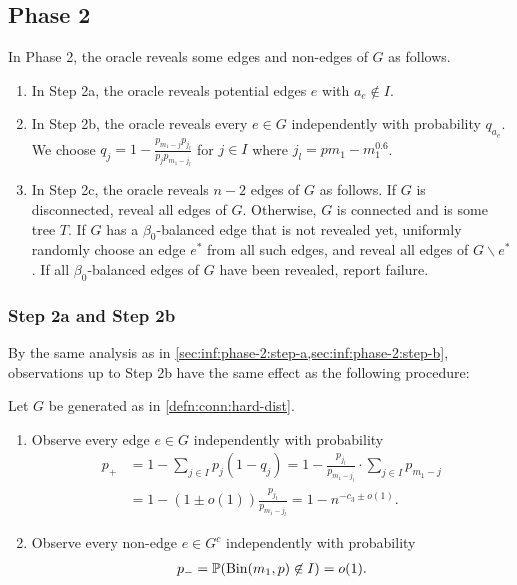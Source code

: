 \subsection{Phase 2} \label{sec:conn:phase-2}
In Phase 2, the oracle reveals some edges and non-edges of $G$ as follows.
\begin{enumerate}[label=2\alph*.]
  \item In Step 2a, the oracle reveals potential edges $e$ with $a_e\not \in I$.
  \item In Step 2b, the oracle reveals every $e\in G$ independently with probability $q_{a_e}$. We choose $q_j = 1-\frac{p_{m_1-j} p_{j_l}}{p_j p_{m_1-j_l}}$ for $j\in I$ where $j_l = p m_1 - m_1^{0.6}$.
  \item In Step 2c, the oracle reveals $n-2$ edges of $G$ as follows. If $G$ is disconnected, reveal all edges of $G$. Otherwise, $G$ is connected and is some tree $T$. If $G$ has a $\beta_0$-balanced edge that is not revealed yet, uniformly randomly choose an edge $e^*$ from all such edges, and reveal all edges of $G\backslash e^*$. If all $\beta_0$-balanced edges of $G$ have been revealed, report failure.
\end{enumerate}







\subsubsection{Step 2a and Step 2b} \label{sec:conn:phase-2:step-ab}

By the same analysis as in \cref{sec:inf:phase-2:step-a,sec:inf:phase-2:step-b}, observations up to Step 2b have the same effect as the following procedure:
\begin{definition} \label{defn:conn:alt-obs}
  Let $G$ be  generated as in \cref{defn:conn:hard-dist}.
  \begin{enumerate}[label=(\arabic*)]
    \item Observe every edge $e\in G$ independently with probability
    \begin{align*}
      p_+ &= 1-\sum_{j\in I} p_j (1-q_j)
      = 1 - \frac{p_{j_l}}{p_{m_1-j_l}} \cdot \sum_{j\in I} p_{m_1-j} \\
      \nonumber &= 1-(1\pm o(1)) \frac{p_{j_l}}{p_{m_1-j_l}} = 1-n^{-c_3\pm o(1)}.
    \end{align*}
    \item Observe every non-edge $e\in G^c$ independently with probability
    \begin{align*}
      p_- = \mathbb{P}(\operatorname{\mathrm{Bin}}(m_1,p)\not \in I) = o(1).
    \end{align*}
  \end{enumerate}
\end{definition}


